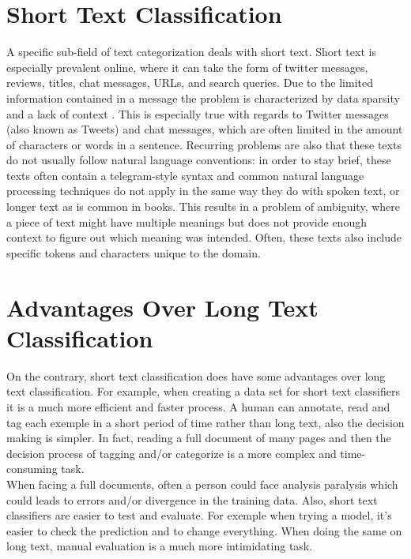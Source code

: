 \section{Short Text Classification}

A specific sub-field of text categorization deals with short text. Short text is especially prevalent online, where it can take the form of twitter messages, reviews, titles, chat messages, URLs, and search queries. Due to the limited information contained in a message the problem is characterized by data sparsity and a lack of context \cite{Wang2017}. This is especially true with regards to Twitter messages (also known as Tweets) and chat messages, which are often limited in the amount of characters or words in a sentence. Recurring problems are also that these texts do not usually follow natural language conventions: in order to stay brief, these texts often contain a telegram-style syntax and common natural language processing techniques do not apply in the same way they do with spoken text, or longer text as is common in books. This results in a problem of ambiguity, where a piece of text might have multiple meanings but does not provide enough context to figure out which meaning was intended. Often, these texts also include specific tokens and characters unique to the domain. 

\section{Advantages Over Long Text Classification}
On the contrary, short text classification does have some advantages over long text classification. For example, when creating a data set for short text classifiers it is a much more efficient and faster process. A human can annotate, read and tag each exemple in a short period of time rather than long text, also the decision making is simpler. In fact, reading a full document of many pages and then the decision process of tagging and/or categorize is a more complex and time-consuming task.\\

When facing a full documents, often a person could face analysis paralysis \cite{Bonn2007} which could leads to errors and/or divergence in the training data.
Also, short text classifiers are easier to test and evaluate. For exemple when trying a model, it’s easier to check the prediction and to change everything. When doing the same on long text, manual evaluation is a much more intimidating task.


